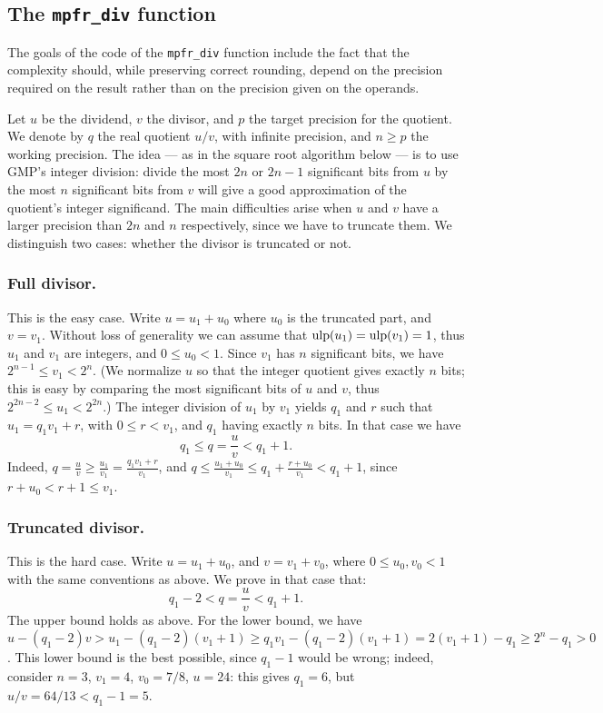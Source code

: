\documentclass[12pt]{amsart}
\def\ulp{{\rm ulp}}
\begin{document}
\subsection{The {\tt mpfr\_div} function}

The goals of the code of the {\tt mpfr\_div} function include the fact
that the complexity should, while preserving correct
rounding, depend on the precision required on the result rather than
on the precision given on the operands.

Let $u$ be the dividend, $v$ the divisor, and $p$ the target precision
for the quotient. We denote by $q$ the real quotient $u/v$, with infinite
precision, and $n \geq p$ the working precision.
The idea --- as in the square root algorithm below --- is to use GMP's
integer division: divide the most $2n$ or $2n-1$ significant bits from $u$ by
the most $n$ significant bits from $v$ will give a good approximation of
the quotient's integer significand.
The main difficulties arise when $u$ and $v$ have a larger precision than
$2n$ and $n$ respectively, since we have to truncate them.
We distinguish two cases: whether the divisor is truncated or not.

\subsubsection{Full divisor.}
This is the easy case. Write $u = u_1 + u_0$ where $u_0$ is the truncated
part, and $v = v_1$. Without loss of generality we can assume that
$\ulp(u_1)=\ulp(v_1)=1$, thus $u_1$ and $v_1$ are integers, and
$0 \leq u_0 < 1$.
Since $v_1$ has $n$ significant bits, we have $2^{n-1} \leq v_1 < 2^n$.
(We normalize $u$ so that the integer quotient gives exactly $n$ bits;
this is easy by comparing the most significant bits of $u$ and $v$,
thus $2^{2n-2} \leq u_1 < 2^{2n}$.)
The integer division of $u_1$ by $v_1$ yields $q_1$ and $r$
such that $u_1 = q_1 v_1 + r$, with $0 \leq r < v_1$, and
$q_1$ having exactly $n$ bits.
In that case we have
\[ q_1 \leq q=\frac{u}{v} < q_1 + 1. \]
Indeed, $q = \frac{u}{v} \geq \frac{u_1}{v_1} = \frac{q_1 v_1 + r}{v_1}$,
and $q \leq \frac{u_1+u_0}{v_1} \leq q_1 + \frac{r + u_0}{v_1} < q_1 + 1$,
since $r + u_0 < r+1 \leq v_1$.

\subsubsection{Truncated divisor.} This is the hard case.
Write $u = u_1 + u_0$, and $v = v_1 + v_0$, where $0 \leq u_0, v_0 < 1$
with the same conventions as above.
We prove in that case that:
\begin{equation} \label{diveq}
q_1-2 < q = \frac{u}{v} < q_1 + 1.
\end{equation}
The upper bound holds as above.
For the lower bound, we have $u - (q_1-2) v >
u_1 - (q_1-2) (v_1+1) \geq q_1 v_1 - (q_1-2) (v_1+1)
= 2 (v_1+1) - q_1 \geq 2^n - q_1 > 0$.
This lower bound is the best possible, since $q_1-1$ would be wrong;
indeed, consider $n=3$, $v_1=4$, $v_0 = 7/8$, $u=24$: this gives $q_1 = 6$,
but $u/v = 64/13 < q_1-1 = 5$.
\end{document}
